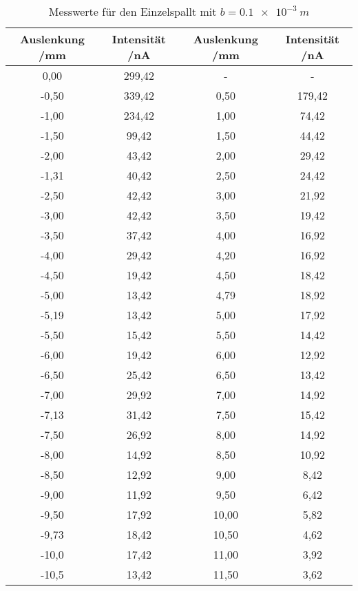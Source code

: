 \begin{table}[h!]
  \centering
  \caption{Messwerte für den Einzelspallt mit $b=\SI{0,1e-3}{m}$}
  \label{tab:1b}
  \begin{tabular}{c c c c}
    \toprule
       Auslenkung /mm  & Intensität /nA & Auslenkung /mm  & Intensität /nA  \\
    \midrule

    0,00		&299,42&-&-\\
   -0,50		&339,42&0,50		&179,42\\
   -1,00		&234,42&1,00		&74,42\\
   -1,50		&99,42&1,50		&44,42\\
   -2,00		&43,42&2,00		&29,42\\
   -1,31		&40,42&2,50		&24,42\\
   -2,50		&42,42&3,00		&21,92\\
   -3,00		&42,42&3,50		&19,42\\
   -3,50		&37,42&4,00		&16,92\\
   -4,00		&29,42&4,20		&16,92\\
   -4,50		&19,42&4,50		&18,42\\
   -5,00		&13,42&4,79		&18,92\\
   -5,19		&13,42&5,00		&17,92\\
   -5,50		&15,42&5,50		&14,42\\
   -6,00		&19,42&6,00		&12,92\\
   -6,50		&25,42&6,50		&13,42\\
   -7,00		&29,92&7,00		&14,92\\
   -7,13		&31,42&7,50		&15,42\\
   -7,50		&26,92&8,00		&14,92\\
   -8,00		&14,92&8,50		&10,92\\
   -8,50		&12,92&9,00		&8,42\\
   -9,00		&11,92&9,50		&6,42\\
   -9,50		&17,92&10,00		&5,82\\
   -9,73		&18,42&10,50		&4,62\\
   -10,0		&17,42&11,00		&3,92\\
   -10,5		&13,42&11,50		&3,62\\



   \bottomrule
\end{tabular}
\end{table}
